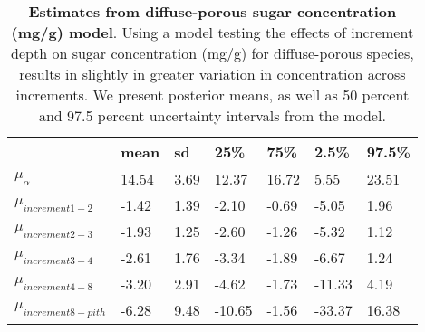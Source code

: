 \documentclass{article}\usepackage[]{graphicx}\usepackage[]{color}
\begin{document}
\begin{table}[ht]
\centering
\caption{\textbf{Estimates from diffuse-porous sugar concentration (mg/g) model}. Using a model testing the effects of increment depth on sugar concentration (mg/g) for diffuse-porous species, results in slightly in greater variation in concentration across increments. We present posterior means, as well as 50 percent and 97.5 percent uncertainty intervals from the model.} 
\label{tab:lat}
\begingroup\footnotesize
\begin{tabular}{|p{}|p{}|p{}|p{}|p{}|p{}|p{}|}
  \hline
 & mean & sd & 25\% & 75\% & 2.5\% & 97.5\% \\ 
  \hline
$\mu_{\alpha}$ & 14.54 & 3.69 & 12.37 & 16.72 & 5.55 & 23.51 \\ 
  $\mu_{increment 1-2}$ & -1.42 & 1.39 & -2.10 & -0.69 & -5.05 & 1.96 \\ 
  $\mu_{increment 2-3}$ & -1.93 & 1.25 & -2.60 & -1.26 & -5.32 & 1.12 \\ 
  $\mu_{increment 3-4}$ & -2.61 & 1.76 & -3.34 & -1.89 & -6.67 & 1.24 \\ 
  $\mu_{increment 4-8}$ & -3.20 & 2.91 & -4.62 & -1.73 & -11.33 & 4.19 \\ 
  $\mu_{increment 8-pith}$ & -6.28 & 9.48 & -10.65 & -1.56 & -33.37 & 16.38 \\ 
   \hline
\end{tabular}
\endgroup
\end{table}
\end{document}
